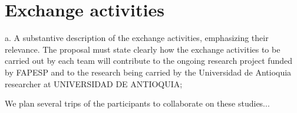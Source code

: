 \documentclass[a4paper,10pt,epsfig,epsf,amsfonts,amsmath]{article}
\begin{document}








\section{Exchange activities}
\begin{instructions}
a.  A substantive description of the exchange activities, emphasizing their relevance. The proposal must state clearly how the exchange activities to be carried out by each team will contribute to the ongoing research project funded by FAPESP and to the research being carried by the Universidad de Antioquia researcher at UNIVERSIDAD DE ANTIOQUIA;

\end{instructions}

We plan several trips of the participants to collaborate on these studies...

\end{document}
